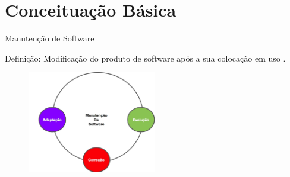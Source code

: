 \section{Conceituação Básica}

\begin{frame}[t, fragile]{Manutenção de Software}
    \begin{block}{Definição:}
    \alert{Modificação} do produto de software \alert{após} a sua colocação em \alert{uso} \textcolor{Blue}{\cite{Sommerville2011}}.
    \end{block}
    
    \begin{figure}[hbt]
    \includegraphics[width=0.5\textwidth]{imagens/tipos-de-manuntencao.jpg}
  \end{figure}
    
\end{frame}

